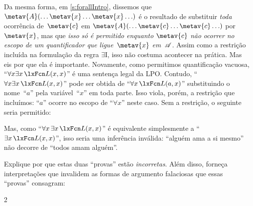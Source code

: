 Da mesma forma, em \cref{s:forallIntro}, dissemos que $\metav{A}(\ldots
\metav{x} \ldots \metav{x}\ldots)$ é o resultado de substituir
\emph{toda} ocorrência de~$\metav{c}$ em $\metav{A}(\ldots \metav{c}
\ldots \metav{c}\ldots)$ por~$\metav{x}$, mas que \emph{isso só é
permitido enquanto $\metav{c}$ não ocorrer no escopo de um
quantificador que ligue~$\metav{x}$ em~$\mathscr{A}$}. Assim como a restrição
incluída na formulação da regra $\exists$I, isso não costuma acontecer
na prática. Mas eis por que ela é importante. Novamente, como permitimos
quantificação vacuosa, \textquotedblleft $\forall
x\exists x\,\atom{L}{x,x}$\textquotedblright{} é uma sentença legal da LPO. Contudo,
\textquotedblleft $\forall x\exists x\,\atom{L}{x,x}$\textquotedblright{} pode ser obtida de \textquotedblleft $\forall
x\,\atom{L}{a,x}$\textquotedblright{} substituindo o nome~\textquotedblleft $a$\textquotedblright{} pela variável~\textquotedblleft $x$\textquotedblright{}
em toda parte. Isso viola, porém, a restrição que incluímos: \textquotedblleft $a$\textquotedblright{}
ocorre no escopo de \textquotedblleft $\forall x$\textquotedblright{} neste caso. Sem a restrição, o seguinte seria permitido:

\begin{fitchproof}
	\PR
\ifHTMLtarget
\else
{}
\fi
\end{fitchproof}
Mas, como \textquotedblleft $\forall x\, \exists x\, \atom{L}{x,x}$\textquotedblright{} é equivalente
simplesmente a \textquotedblleft $\exists x\, \atom{L}{x,x}$\textquotedblright{}, isso seria uma inferência
inválida: \textquotedblleft alguém ama a si mesmo\textquotedblright{} não decorre de
\textquotedblleft todos amam alguém\textquotedblright{}.

\practiceproblems
\problempart
Explique por que estas duas \textquotedblleft provas\textquotedblright{} estão \emph{incorretas}. Além disso, forneça interpretações que invalidem as formas de argumento falaciosas que essas \textquotedblleft provas\textquotedblright{} consagram:
\begin{multicols}{2}
	\begin{fitchproof}
		\PR
	\end{fitchproof}
	\begin{fitchproof}
		\hypo{AE}{\forall x\, \exists y\, \atom{R}{x,y}}\PR
		\Ae{AE}
		\open
			\hypo{ass}{\atom{R}{a,a}}\AS
			\Ei{ass}
		\close
		\Ee{E, ass-Ex}
	\end{fitchproof}
\end{multicols}

